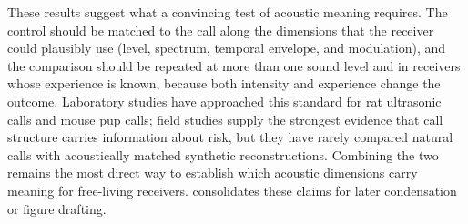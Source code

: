 These results suggest what a convincing test of acoustic meaning requires. The control should be matched to the call along the dimensions that the receiver could plausibly use (level, spectrum, temporal envelope, and modulation), and the comparison should be repeated at more than one sound level and in receivers whose experience is known, because both intensity and experience change the outcome. Laboratory studies have approached this standard for rat ultrasonic calls and mouse pup calls; field studies supply the strongest evidence that call structure carries information about risk, but they have rarely compared natural calls with acoustically matched synthetic reconstructions. Combining the two remains the most direct way to establish which acoustic dimensions carry meaning for free-living receivers.
 consolidates these claims for later condensation or figure drafting.


